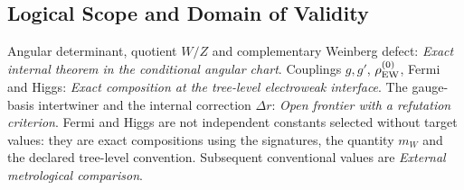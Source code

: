\subsection*{Logical Scope and Domain of Validity}
Angular determinant, quotient \(W/Z\) and complementary Weinberg defect:
\emph{Exact internal theorem in the conditional angular chart}. Couplings \(g,g'\),
\(\rho_{\rm EW}^{(0)}\), Fermi and Higgs: \emph{Exact composition at the
tree-level electroweak interface}. The gauge-basis intertwiner and the
internal correction \(\Delta r\): \emph{Open frontier with a refutation criterion}.
Fermi and Higgs are not independent constants selected without target
values: they are exact compositions using the signatures, the quantity
\(m_W\) and the
declared tree-level convention. Subsequent conventional values
are \emph{External metrological comparison}.

